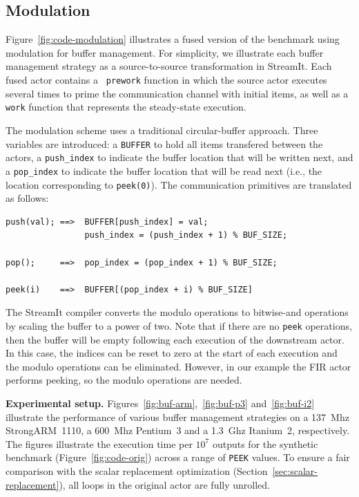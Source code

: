 \documentclass{sigplanconf}
\begin{document}
\subsection{Modulation}

Figure~\ref{fig:code-modulation} illustrates a fused version of the
benchmark using modulation for buffer management.  For simplicity, we
illustrate each buffer management strategy as a source-to-source
transformation in StreamIt.  Each fused actor contains a {\tt
prework} function in which the source actor executes several times to
prime the communication channel with initial items, as well as a {\tt
work} function that represents the steady-state execution.

The modulation scheme uses a traditional circular-buffer approach.
Three variables are introduced: a {\tt BUFFER} to hold all items
transfered between the actors, a {\tt push\_index} to indicate the
buffer location that will be written next, and a {\tt pop\_index} to
indicate the buffer location that will be read next (i.e., the
location corresponding to {\tt peek(0)}).  The communication
primitives are translated as follows: 

{\scriptsize
\begin{verbatim}
push(val); ==>  BUFFER[push_index] = val;
                push_index = (push_index + 1) % BUF_SIZE;

pop();     ==>  pop_index = (pop_index + 1) % BUF_SIZE;

peek(i)    ==>  BUFFER[(pop_index + i) % BUF_SIZE]
\end{verbatim}}
\noindent The StreamIt compiler converts the modulo operations to
bitwise-and operations by scaling the buffer to a power of two.  Note
that if there are no {\tt peek} operations, then the buffer will be
empty following each execution of the downstream actor.  In this
case, the indices can be reset to zero at the start of each execution
and the modulo operations can be eliminated.  However, in our example
the FIR actor performs peeking, so the modulo operations are
needed.

{\bf Experimental setup.}  Figures~\ref{fig:buf-arm},~\ref{fig:buf-p3}
and~\ref{fig:buf-i2} illustrate the performance of various buffer
management strategies on a 137~Mhz StrongARM~1110, a 600~Mhz Pentium~3
and a 1.3~Ghz Itanium~2, respectively.  The figures illustrate the
execution time per $10^7$ outputs for the synthetic benchmark
(Figure~\ref{fig:code-orig}) across a range of {\tt PEEK} values.  To
ensure a fair comparison with the scalar replacement optimization
(Section~\ref{sec:scalar-replacement}), all loops in the original
actor are fully unrolled.
\end{document}
